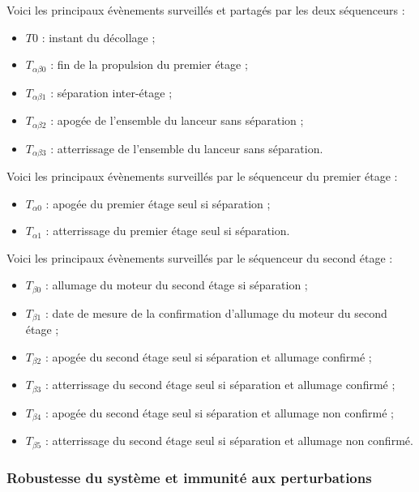 \newpage

Voici les principaux évènements surveillés et partagés par les deux séquenceurs :
\begin{itemize}
    \item $T0$ : instant du décollage ;
    \item $T_{\alpha\beta0}$ : fin de la propulsion du premier étage ;
    \item $T_{\alpha\beta1}$ : séparation inter-étage ;
    \item $T_{\alpha\beta2}$ : apogée de l'ensemble du lanceur sans séparation ;
    \item $T_{\alpha\beta3}$ : atterrissage de l'ensemble du lanceur sans séparation.\\
\end{itemize}

Voici les principaux évènements surveillés par le séquenceur du premier étage :
\begin{itemize}
    \item $T_{\alpha0}$ : apogée du premier étage seul si séparation ;
    \item $T_{\alpha1}$ : atterrissage du premier étage seul si séparation.\\
\end{itemize}

Voici les principaux évènements surveillés par le séquenceur du second étage :
\begin{itemize}
    \item $T_{\beta0}$ : allumage du moteur du second étage si séparation ;
    \item $T_{\beta1}$ : date de mesure de la confirmation d’allumage du moteur du second étage ;
    \item $T_{\beta2}$ : apogée du second étage seul si séparation et allumage confirmé ;
    \item $T_{\beta3}$ : atterrissage du second étage seul si séparation et allumage confirmé ;
    \item $T_{\beta4}$ : apogée du second étage seul si séparation et allumage non confirmé ;
    \item $T_{\beta5}$ : atterrissage du second étage seul si séparation et allumage non confirmé.\\
\end{itemize}

\subsubsection{Robustesse du système et immunité aux perturbations}

